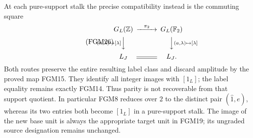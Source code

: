 At each pure-support stalk the precise compatibility instead is
the commuting square
\begin{equation}\tag{FGM26}
 \begin{CD}
 G_L(\mathbb Z) @>{\pi_2}>> G_L(\mathbb F_2)\\
 @V{(n,\lambda)\mapsto[\lambda]}VV
 @VV{(a,\lambda)\mapsto[\lambda]}V\\
 L_J @= L_J .
 \end{CD}
\end{equation}
Both routes preserve the entire resulting label class and discard
amplitude by the proved map FGM15. They identify all integer
images with $[1_L]$; the label equality remains exactly FGM14.
Thus parity is not recoverable from that support quotient.
In particular FGM8 reduces over $2$ to the distinct pair
$(\widehat1,e)$, whereas its two entries both become $[1_L]$
in a pure-support stalk. The image of the new base unit is always
the appropriate target unit in FGM19; its ungraded source
designation remains unchanged.

